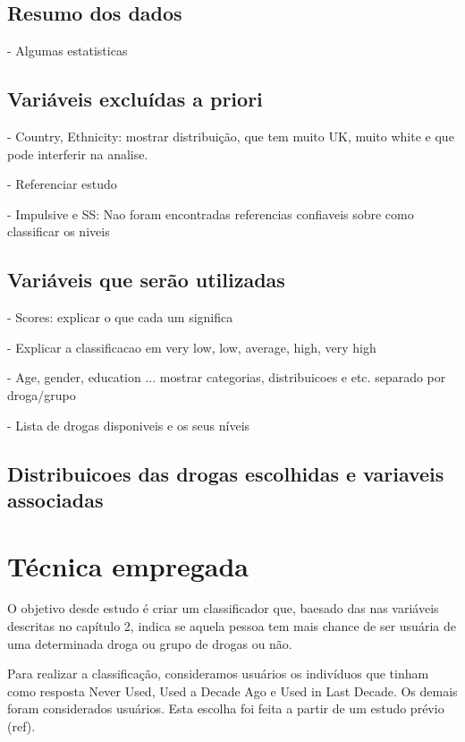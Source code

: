\documentclass[
	article,			%
	11pt,				%
	oneside,			%
	a4paper,			%
	english,			%
	brazil,				%
	sumario=tradicional
	]{abntex2}
\begin{document}
\subsection{Resumo dos dados}

- Algumas estatisticas

\subsection{Variáveis excluídas a priori}

- Country, Ethnicity: mostrar distribuição, que tem muito UK, muito white e que pode interferir na analise.

- Referenciar estudo

- Impulsive e SS: Nao foram encontradas referencias confiaveis sobre como classificar os niveis

\subsection{Variáveis que serão utilizadas}

- Scores: explicar o que cada um significa

- Explicar a classificacao em very low, low, average, high, very high

- Age, gender, education ... mostrar categorias, distribuicoes e etc. separado por droga/grupo

- Lista de drogas disponiveis e os seus níveis

\subsection{Distribuicoes das drogas escolhidas e variaveis associadas}


\section{Técnica empregada}

O objetivo desde estudo é criar um classificador que, baesado das nas variáveis descritas no capítulo 2, indica se aquela pessoa tem mais chance de ser usuária de uma determinada droga ou grupo de drogas ou não. 

Para realizar a classificação, consideramos usuários os indivíduos que tinham como resposta Never Used, Used a Decade Ago e Used in Last Decade. Os demais foram considerados usuários. Esta escolha foi feita a partir de um estudo prévio (ref).
\end{document}
